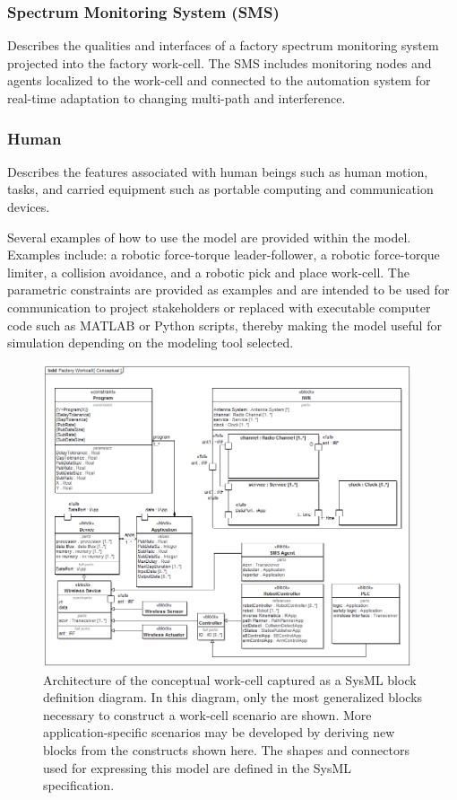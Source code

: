 \subsubsection{Spectrum Monitoring System (SMS)} Describes the qualities and interfaces of a factory spectrum monitoring system projected into the factory work-cell.  The SMS includes monitoring nodes and agents localized to the work-cell and connected to the automation system for real-time adaptation to changing multi-path and interference. 

\subsubsection{Human} Describes the features associated with human beings such as human motion, tasks, and carried equipment such as portable computing and communication devices.
\vspace{3mm} 

Several examples of how to use the model are provided within the model\cite{SysML.Candell2018}.  Examples include: a robotic force-torque leader-follower, a robotic force-torque limiter, a collision avoidance, and a robotic pick and place work-cell.  The parametric constraints are provided as examples and are intended to be used for communication to project stakeholders or replaced with executable computer code such as MATLAB or Python scripts, thereby making the model useful for simulation depending on the modeling tool selected.

\begin{figure}
	
	\centering
	\includegraphics[width=0.97\textwidth]{./chapter-sysml/diagrams/bdd__Factory_Workcell__Conceptual}
	\caption{Architecture of the conceptual work-cell captured as a SysML block definition diagram.  In this diagram, only the most generalized blocks necessary to construct a work-cell scenario are shown.  More application-specific scenarios may be developed by deriving new blocks from the constructs shown here. The shapes and connectors used for expressing this model are defined in the SysML specification\cite{SysML2017}. }
	\label{sysml:fig:conceptual:bdd}
	
\end{figure}

